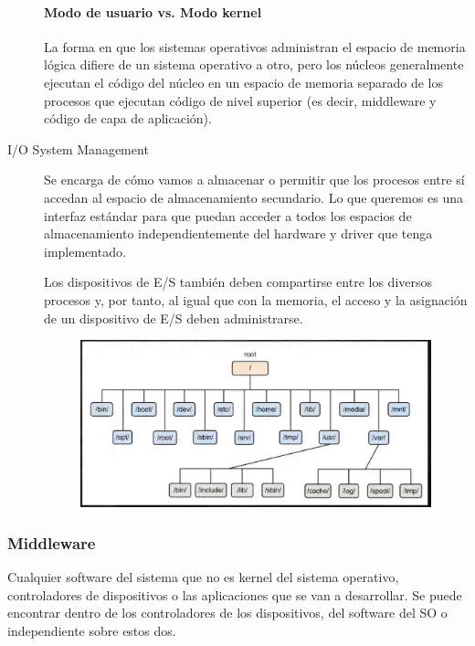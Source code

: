 \documentclass[12pt, twoside, openright]{report} %
\begin{document}
\begin{description}
	      \paragraph{Modo de usuario vs. Modo kernel}
	      La forma en que los sistemas operativos administran el espacio de memoria lógica difiere de un sistema operativo a otro, pero los núcleos generalmente ejecutan el código del núcleo en un espacio de memoria separado de los procesos que ejecutan código de nivel superior (es decir, middleware y código de capa de aplicación).


	\item[I/O System Management] Se encarga de cómo vamos a almacenar o permitir que los procesos entre sí accedan al espacio de almacenamiento secundario. Lo que queremos es una interfaz estándar para que puedan acceder a todos los espacios de almacenamiento independientemente del hardware y driver que tenga implementado.

	      Los dispositivos de E/S también deben compartirse entre los diversos procesos y, por tanto, al igual que con la memoria, el acceso y la asignación de un dispositivo de E/S deben administrarse.

	      \begin{figure}[H]
		      {\includegraphics[scale=.5]{2021-03-25 11_52_40-2021-03-24 16-59-20.mkv.png}}
	      \end{figure}

\end{description}

\subsubsection{Middleware}

Cualquier software del sistema que no es kernel del sistema operativo, controladores de dispositivos o las aplicaciones que se van a desarrollar. Se puede encontrar dentro de los controladores de los dispositivos, del software del SO o independiente sobre estos dos.
\end{document}
